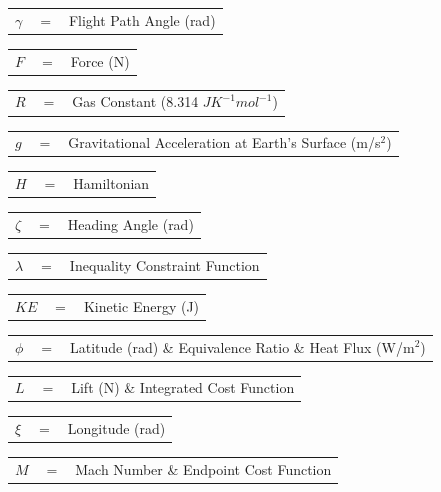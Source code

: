 \begin{tabular}{p{0.8cm}p{0.8cm}p{5.6cm}}
	$\gamma$ & $=$ & Flight Path Angle (rad)\\
\end{tabular} 
\begin{tabular}{p{0.8cm}p{0.8cm}p{5.6cm}}
	$F$ & $=$ & Force (N)\\
\end{tabular} 
\begin{tabular}{p{0.8cm}p{0.8cm}p{5.6cm}}
	$R$ & $=$ & Gas Constant (8.314 $J K^{-1} mol^{-1}$)\\
\end{tabular} 
\begin{tabular}{p{0.8cm}p{0.8cm}p{5.6cm}}
	$g$ & $=$ & Gravitational Acceleration at Earth's Surface (m/s$^2$)\\
\end{tabular}
\begin{tabular}{p{0.8cm}p{0.8cm}p{5.6cm}}
	$H$ & $=$ & Hamiltonian\\
\end{tabular}
\begin{tabular}{p{0.8cm}p{0.8cm}p{5.6cm}}
	$\zeta$ & $=$ & Heading Angle (rad)\\
\end{tabular}
\begin{tabular}{p{0.8cm}p{0.8cm}p{5.6cm}}
	$\lambda$ & $=$ & Inequality Constraint Function\\
\end{tabular}
\begin{tabular}{p{0.8cm}p{0.8cm}p{5.6cm}}
	$KE$ & $=$ & Kinetic Energy (J)\\
\end{tabular} 
\begin{tabular}{p{0.8cm}p{0.8cm}p{5.6cm}}
	$\phi$ & $=$ & Latitude (rad) \& Equivalence Ratio \& Heat Flux (W/m$^2$)\\
\end{tabular}
\begin{tabular}{p{0.8cm}p{0.8cm}p{5.6cm}}
	$L$ & $=$ & Lift (N) \& Integrated Cost Function\\
\end{tabular} 
\begin{tabular}{p{0.8cm}p{0.8cm}p{5.6cm}}
	$\xi$ & $=$ & Longitude (rad)\\
\end{tabular} 
\begin{tabular}{p{0.8cm}p{0.8cm}p{5.6cm}}
	$M$ & $=$ & Mach Number \& Endpoint Cost Function\\
\end{tabular}
